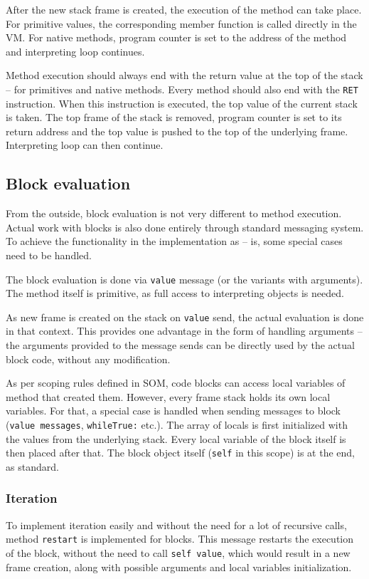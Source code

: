 \documentclass[thesis=M,english]{FITthesis}[2019/12/23]
\begin{document}
After the new stack frame is created, the execution of the method can take place. For primitive values, the corresponding member function
is called directly in the VM. For native methods, program counter is set to the address of the method and interpreting loop continues.

Method execution should always end with the return value at the top of the stack -- for primitives and native methods. Every method
should also end with the \texttt{RET} instruction. When this instruction is executed, the top value of the current stack is taken.
The top frame of the stack is removed, program counter is set to its return address and the top value is pushed to the top of the
underlying frame. Interpreting loop can then continue.

\subsection{Block evaluation}
From the outside, block evaluation is not very different to method execution. Actual work with blocks is also done entirely through
standard messaging system. To achieve the functionality in the implementation as -- is, some special cases need to be handled.

The block evaluation is done via \texttt{value} message (or the variants with arguments). The method itself is primitive, as full
access to interpreting objects is needed. 

As new frame is created on the stack on \texttt{value} send, the actual evaluation is done in that context. This provides one advantage
in the form of handling arguments -- the arguments provided to the message sends can be directly used by the actual block code, without
any modification. 

As per scoping rules defined in SOM, code blocks can access local variables of method that created them. However, every frame stack holds
its own local variables. For that, a special case is handled when sending messages to block (\texttt{value messages}, \texttt{whileTrue:} etc.).
The array of locals is first initialized with the values from the underlying stack. Every local variable of the block itself is then placed
after that. The block object itself (\texttt{self} in this scope) is at the end, as standard.

\subsubsection{Iteration}
To implement iteration easily and without the need for a lot of recursive calls, method \texttt{restart} is implemented for blocks.
This message restarts the execution of the block, without the need to call \texttt{self value}, which would result in a new frame
creation, along with possible arguments and local variables initialization.
\end{document}
